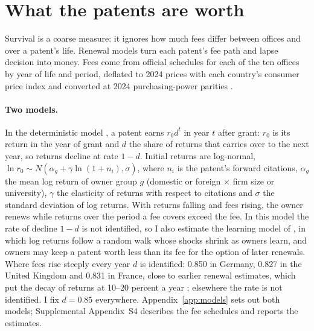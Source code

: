 \section{What the patents are worth}\label{sec:values}

Survival is a coarse measure: it ignores how much fees differ between offices and over a patent's life. Renewal
models turn each patent's fee path and lapse decision into money. Fees come from official schedules for each of the
ten offices by year of life and period, deflated to 2024 prices with each country's consumer price index and
converted at 2024 purchasing-power parities \citep{WDI}.

\paragraph{Two models.} In the deterministic model \citep{SchankermanPakes1986}, a patent earns $r_0 d^t$ in year $t$
after grant: $r_0$ is its return in the year of grant and $d$ the share of returns that carries over to the next
year, so returns decline at rate $1-d$. Initial returns are log-normal, $\ln r_0 \sim N(\alpha_g + \gamma \ln(1+n_i),
\sigma)$, where $n_i$ is the patent's forward citations, $\alpha_g$ the mean log return of owner group $g$
(domestic or foreign $\times$ firm size or university), $\gamma$ the elasticity of returns with respect to citations
and $\sigma$ the standard deviation of log returns. With returns falling and fees rising, the owner renews while
returns over the period a fee covers exceed the fee. In this model the rate of decline $1-d$ is not identified, so I also estimate the
learning model of \citet{Pakes1986}, in which log returns follow a random walk whose shocks shrink as owners learn,
and owners may keep a patent worth less than its fee for the option of later renewals. Where fees rise steeply every year $d$ is identified: 0.850 in Germany, 0.827 in the United Kingdom
and 0.831 in France, close to earlier renewal estimates, which put the decay of returns at 10--20 percent a
year \citep{SchankermanPakes1986,Griliches1990}; elsewhere the rate is not identified. I fix $d = 0.85$ everywhere. Appendix~\ref{app:models} sets out both models; Supplemental Appendix~S4 describes the fee schedules and reports the estimates.

